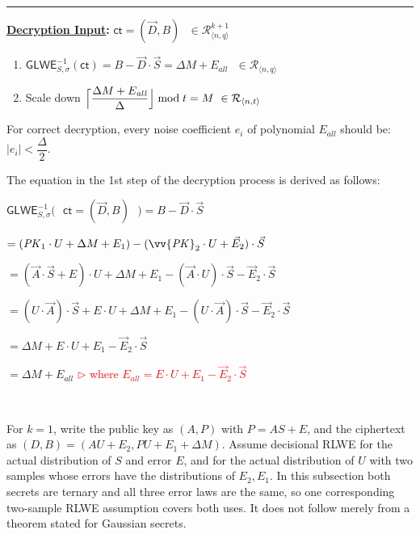 \begin{tcolorbox}[title={\textbf{\tboxlabel{\ref*{subsec:glwe-public-key-enc}} RLWE Public Key Encryption ($k=1$)}}]
\begin{enumerate}
\end{enumerate}


\par\noindent\rule{\textwidth}{0.4pt}

\textbf{\underline{Decryption Input}:} $\textsf{ct} = (\vec{D}, B) \text{ } \in \mathcal{R}_{\langle n,q \rangle}^{k + 1}$

\begin{enumerate}
\item $\textsf{GLWE}^{-1}_{S,\sigma}(\textsf{ct}) = B - \vec{D} \cdot \vec{S} = \Delta  M + E_{\mathit{all}} \text{ } \in \mathcal{R}_{\langle n,q \rangle}$

\item Scale down 
$\Bigl\lceil \dfrac{ \Delta  M + E_{\mathit{all}} }{\Delta}\Bigr\rfloor \bmod t = M  \text{ } \in \mathcal{R}_{\langle n, t \rangle}$

\end{enumerate}

For correct decryption, every noise coefficient $e_i$ of polynomial $E_{\mathit{all}}$ should be: $|e_i| < \dfrac{\Delta}{2}$.

\end{tcolorbox}


The equation in the 1st step of the decryption process is derived as follows:

$\textsf{GLWE}^{-1}_{S,\sigma}\bm{(}\text{ } \textsf{ct} = (\vec{D}, B) \text{ }\bm{)} = B - \vec{D}\cdot\vec{S}$

$ = (\mathit{PK}_1\cdot U + \Delta  M + E_1) - (\vv{\mathit{PK}}_2 \cdot U + \vec{E}_2)\cdot \vec{S} $

$=  (\vec{A} \cdot \vec{S} + E)\cdot U + \Delta M + E_1 - (\vec{A}\cdot U)\cdot \vec{S} - \vec{E}_2\cdot\vec{S}$

$=  (U\cdot\vec{A}) \cdot \vec{S} + E \cdot U + \Delta M + E_1 - (U\cdot \vec{A}) \cdot \vec{S} - \vec{E}_2\cdot\vec{S}$

$= \Delta M + E \cdot U + E_1 - \vec{E}_2\cdot\vec{S}$

$= \Delta M + E_{\mathit{all}}$ \textcolor{red}{ $\rhd$ where $E_{\mathit{all}} = E \cdot U + E_1 - \vec{E}_2\cdot\vec{S}$} 


$ $

 For $k=1$, write the public key as $(A,P)$ with $P=AS+E$, and the ciphertext as $(D,B)=(AU+E_2,PU+E_1+\Delta M)$. Assume decisional RLWE for the actual distribution of $S$ and error $E$, and for the actual distribution of $U$ with two samples whose errors have the distributions of $E_2,E_1$. In this subsection both secrets are ternary and all three error laws are the same, so one corresponding two-sample RLWE assumption covers both uses. It does not follow merely from a theorem stated for Gaussian secrets.

